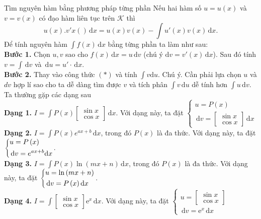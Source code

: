 \begin{dang}{Tìm nguyên hàm bằng phương pháp từng phần}
	Nếu hai hàm số $u = u(x)$ và $v = v(x)$ có đạo hàm liên tục trên $\mathscr{K}$ thì $$\displaystyle {u(x).v'x()} \mathrm{\,d}x = u(x)v(x) - \displaystyle\int{u'(x)v(x)} \mathrm{\,d}x.$$ 
	Để tính nguyên hàm $\displaystyle\int{f\left(x\right)}  \mathrm{\,d}x$ bằng từng phần ta làm như sau:\\
	\textbf{Bước 1.} Chọn $u,  v$ sao cho $f\left(x\right) \mathrm{\,d}x=u \mathrm{\,d}v$ (chú ý $ \mathrm{d}v=v'\left(x\right) \mathrm{\,d}x$). 
	Sau đó tính $v=\displaystyle\int{\mathrm{\,d}v}$ và $ \mathrm{\,d}u=u' \cdot \mathrm{\,d}x$.\\
	\textbf{Bước 2.} Thay vào công thức $\left(*\right)$ và tính $\displaystyle\int{v \mathrm{d}u}$.
	Chú ý. Cần phải lựa chọn $u$ và $dv$ hợp lí sao cho ta dễ dàng tìm được $v$ và tích phân $\displaystyle\int{v \mathrm{\,d}u}$ dễ tính hơn $\displaystyle\int{u \mathrm{\,d}v}$. Ta thường gặp các dạng sau\\
\textbf{Dạng 1.} $I = \displaystyle\int {P\left( x \right)\left[ \begin{array}{l} 	\sin x\\ 	\cos x  	\end{array} \right]{\mathrm{\,d}}x} $. Với dạng này, ta đặt $\left\{ \begin{array}{l}  u = P\left( x \right)\\  {\mathrm{\,d}}v = \left[ \begin{array}{l} \sin x\\ \cos x \end{array} \right]\mathrm{\,d}x \end{array} \right.$ \\
\textbf{Dạng 2.} $I = \displaystyle\int {P\left( x \right){e^{ax + b}}{\mathrm{\,d}}x} $, trong đó $P\left(x\right)$ là đa thức.  
Với dạng này, ta đặt $\left\{\begin{aligned} 	& u=P\left(x\right) \\  	&  \mathrm{\,d}v={e}^{ax+b} \mathrm{d}x \\  \end{aligned}\right.$.\\
\textbf{Dạng 3.} $I=\displaystyle\int{P\left(x\right)\ln \left(mx+n\right) \mathrm{\,d}x}$, trong đó $P\left(x\right)$ là đa thức.
Với dạng này, ta đặt  $\left\{\begin{aligned} 	& u=\ln \left(mx+n\right) \\  	&  \mathrm{\,d}v=P\left(x\right) \mathrm{d}x \\  \end{aligned}\right.$.\\
\textbf{Dạng 4.} $I = \displaystyle\int {\left[ \begin{array}{l} 	\sin x\\  	\cos x 	\end{array} \right]{\mathrm{e}^x}\mathrm{\,d}x} $. Với dạng này, ta đặt $\left\{ \begin{array}{l}
u = \left[ \begin{array}{l}
\sin x\\
\cos x
\end{array} \right]\\
\mathrm{\,d}v = {\mathrm{e}^x}\mathrm{\,d}x
\end{array} \right.$
\end{dang}
